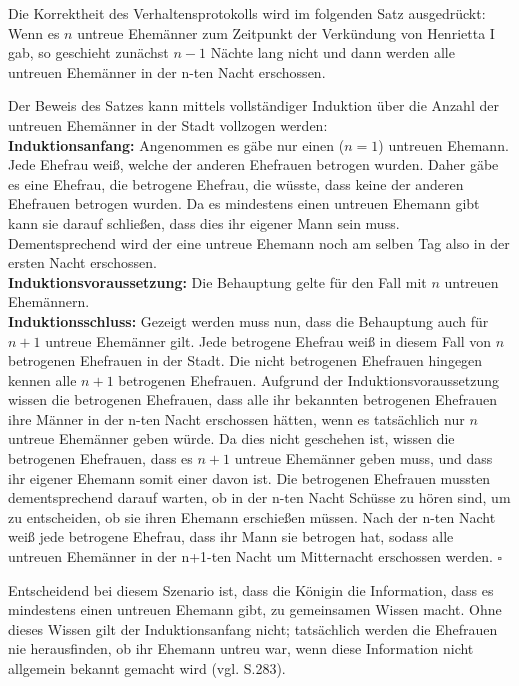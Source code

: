 Die Korrektheit des Verhaltensprotokolls wird im folgenden Satz ausgedrückt:\\
Wenn es $n$ untreue Ehemänner zum Zeitpunkt der Verkündung von Henrietta I gab, so geschieht zunächst $n-1$ Nächte lang nicht und dann werden alle untreuen Ehemänner in der n-ten Nacht erschossen.\medskip

Der Beweis des Satzes kann mittels vollständiger Induktion über die Anzahl der untreuen Ehemänner in der Stadt vollzogen werden:\\
\textbf{Induktionsanfang:} Angenommen es gäbe nur einen ($n=1$) untreuen Ehemann. Jede Ehefrau weiß, welche der anderen Ehefrauen betrogen wurden. Daher gäbe es eine Ehefrau, die betrogene Ehefrau, die wüsste, dass keine der anderen Ehefrauen betrogen wurden. Da es mindestens einen untreuen Ehemann gibt kann sie darauf schließen, dass dies ihr eigener Mann sein muss. Dementsprechend wird der eine untreue Ehemann noch am selben Tag also in der ersten Nacht erschossen.\\
\textbf{Induktionsvoraussetzung:} Die Behauptung gelte für den Fall mit $n$ untreuen Ehemännern.\\
\textbf{Induktionsschluss:} Gezeigt werden muss nun, dass die Behauptung auch für $n+1$ untreue Ehemänner gilt.
Jede betrogene Ehefrau weiß in diesem Fall von $n$ betrogenen Ehefrauen in der Stadt. Die nicht betrogenen Ehefrauen hingegen kennen alle $n+1$ betrogenen Ehefrauen.
Aufgrund der Induktionsvoraussetzung wissen die betrogenen Ehefrauen, dass alle ihr bekannten betrogenen Ehefrauen ihre Männer in der n-ten Nacht erschossen hätten, wenn es tatsächlich nur $n$ untreue Ehemänner geben würde.
Da dies nicht geschehen ist, wissen die betrogenen Ehefrauen, dass es $n+1$ untreue Ehemänner geben muss, und dass ihr eigener Ehemann somit einer davon ist.
Die betrogenen Ehefrauen mussten dementsprechend darauf warten, ob in der n-ten Nacht Schüsse zu hören sind, um zu entscheiden, ob sie ihren Ehemann erschießen müssen.
Nach der n-ten Nacht weiß jede betrogene Ehefrau, dass ihr Mann sie betrogen hat, sodass alle untreuen Ehemänner in der n+1-ten Nacht um Mitternacht erschossen werden. $\square$

Entscheidend bei diesem Szenario ist, dass die Königin die Information, dass es mindestens einen untreuen Ehemann gibt, zu gemeinsamen Wissen macht.
Ohne dieses Wissen gilt der Induktionsanfang nicht; tatsächlich werden die Ehefrauen nie herausfinden, ob ihr Ehemann untreu war, wenn diese Information nicht allgemein bekannt gemacht wird (vgl. \cite{kshemkalyani2011distributed} S.283).

